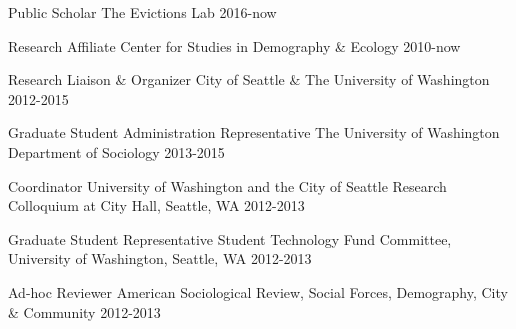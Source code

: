 



\begin{cvhonors}

  \cvhonor
    {Public Scholar} %
    {The Evictions Lab} %
    {} %
    {2016-now} %

  \cvhonor
    {Research Affiliate} %
    {Center for Studies in Demography \& Ecology} %
    {} %
    {2010-now} %

  \cvhonor
    {Research Liaison \& Organizer} %
    {City of Seattle \& The University of Washington} %
    {} %
    {2012-2015} %

  \cvhonor
    {Graduate Student Administration Representative} %
    {The University of Washington Department of Sociology} %
    {} %
    {2013-2015} %

  \cvhonor
    {Coordinator} %
    {University of Washington and the City of Seattle Research Colloquium at City Hall, Seattle, WA} %
    {} %
    {2012-2013} %

  \cvhonor
    {Graduate Student Representative} %
    {Student Technology Fund Committee, University of Washington, Seattle, WA} %
    {} %
    {2012-2013} %

  \cvhonor
    {Ad-hoc Reviewer} %
    {American Sociological Review, Social Forces, Demography, City \& Community} %
    {} %
    {2012-2013} %
    
\end{cvhonors}

